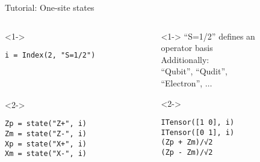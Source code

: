 \begin{frame}[fragile]{Tutorial: One-site states}

\begin{columns}

\begin{column}{4.5cm}

\begin{onlyenv}<1->
  \begin{lstlisting}[language=JuliaLocal, style=julia, basicstyle=\small]
  i = Index(2, "S=1/2")




  \end{lstlisting}
\end{onlyenv}

\begin{onlyenv}<2->

\begin{lstlisting}[language=JuliaLocal, style=julia, basicstyle=\small]
Zp = state("Z+", i)
Zm = state("Z-", i)
Xp = state("X+", i)
Xm = state("X-", i)
\end{lstlisting}

\end{onlyenv}

\end{column}

\begin{column}{4.5cm}

\begin{onlyenv}<1->
``S=1/2'' defines an \\
operator basis \\[\baselineskip]

Additionally:\\
``Qubit'', ``Qudit'',\\
``Electron'', $\dots$
\end{onlyenv}

\begin{onlyenv}<2->
\vspace*{0.6cm}
\begin{lstlisting}[language=JuliaLocal, style=julia, basicstyle=\small]
ITensor([1 0], i)
ITensor([0 1], i)
(Zp + Zm)/√2
(Zp - Zm)/√2
\end{lstlisting}
\end{onlyenv}

\end{column}

\end{columns}

\end{frame}
